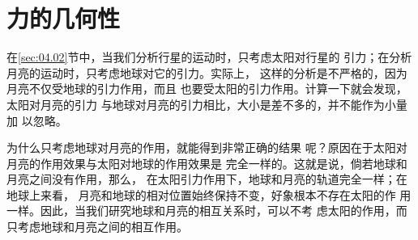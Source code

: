 \section{力的几何性}\label{sec:04.06}

在\ref{sec:04.02}节中，当我们分析行星的运动时，只考虑太阳对行星的
引力；在分析月亮的运动时，只考虑地球对它的引力。实际上，
这样的分析是不严格的，因为月亮不仅受地球的引力作用，而且
也要受太阳的引力作用。计算一下就会发现，太阳对月亮的引力
与地球对月亮的引力相比，大小是差不多的，并不能作为小量加
以忽略。

为什么只考虑地球对月亮的作用，就能得到非常正确的结果
呢？原因在于太阳对月亮的作用效果与太阳对地球的作用效果是
完全一样的。这就是说，倘若地球和月亮之间没有作用，那么，
在太阳引力作用下，地球和月亮的轨道完全一样；在地球上来看，
月亮和地球的相对位置始终保持不变，好象根本不存在太阳的作
用一样。因此，当我们研究地球和月亮的相互关系时，可以不考
虑太阳的作用，而只考虑地球和月亮之间的相互作用。

